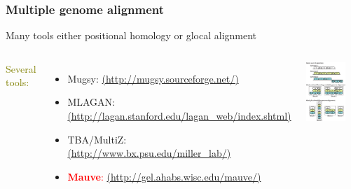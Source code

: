 %
\begin{frame}
  \frametitle{Multiple genome alignment}
  Many tools either positional homology or glocal alignment
  \begin{columns}[T] 
      \textcolor{olive}{Several tools:}
      \begin{itemize}
        \item Mugsy: {\tiny\href{http://mugsy.sourceforge.net/}{(http://mugsy.sourceforge.net/)}}
        \item \textcolor{hutton_blue}{MLAGAN: {\tiny\href{http://lagan.stanford.edu/lagan_web/index.shtml}{(http://lagan.stanford.edu/lagan\_web/index.shtml)}}}
        \item TBA/MultiZ: {\tiny\href{http://www.bx.psu.edu/miller_lab/}{(http://www.bx.psu.edu/miller\_lab/)}}
        \item \textcolor{red}{\textbf{Mauve}: {\tiny\href{http://gel.ahabs.wisc.edu/mauve/}{(http://gel.ahabs.wisc.edu/mauve/)}}}
      \end{itemize}
      \includegraphics[width=0.75\textwidth]{images/poshom_v_glocal}
  \end{columns}    
\end{frame}

